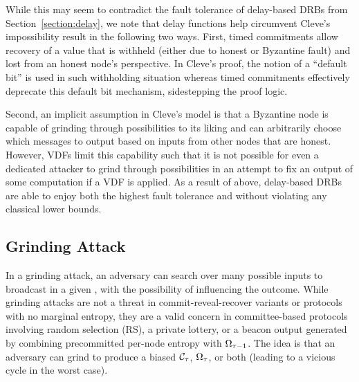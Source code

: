 While this may seem to contradict the fault tolerance of delay-based DRBs from Section~\ref{section:delay}, we note that delay functions help circumvent Cleve's impossibility result in the following two ways.
First, timed commitments allow recovery of a value that is withheld (either due to honest or Byzantine fault) and lost from an honest node's perspective.
In Cleve's proof, the notion of a ``default bit'' is used in such withholding situation whereas timed commitments effectively deprecate this default bit mechanism, sidestepping the proof logic.

Second, an implicit assumption in Cleve's model is that a Byzantine node is capable of grinding through possibilities to its liking and can arbitrarily choose which messages to output based on inputs from other nodes that are honest.
However, VDFs limit this capability such that it is not possible for even a dedicated attacker to grind through possibilities in an attempt to fix an output of some computation if a VDF is applied.
As a result of above, delay-based DRBs are able to enjoy both the highest fault tolerance and \drbsecurity without violating any classical lower bounds.

\subsection{Grinding Attack}
In a grinding attack, an adversary can search over many possible inputs to broadcast in a given \epoch, with the possibility of influencing the outcome. While grinding attacks are not a threat in commit-reveal-recover variants or protocols with no marginal entropy, they are a valid concern in committee-based protocols involving random selection (RS), a private lottery, or a beacon output generated by combining precommitted per-node entropy with $\Omega_{\tau - 1}$. The idea is that an adversary can grind to produce a biased $\mathcal{C}_\tau$, $\Omega_\tau$, or both (leading to a vicious cycle in the worst case).

